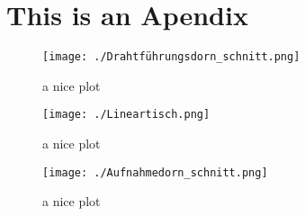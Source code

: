 \appendix

\section{This is an Apendix}
\label{appx:test}

\begin{figure}[H]
    \centering
    \texttt{[image: ./Drahtführungsdorn\_schnitt.png]}
    \caption{a nice plot}
    \label{fig:drahtfuehrungsdorn_schnitt}
\end{figure}

\begin{figure}[H]
    \centering
    \texttt{[image: ./Lineartisch.png]}
    \caption{a nice plot}
    \label{fig:linearstisch}
\end{figure}

\begin{figure}[H]
    \centering
    \texttt{[image: ./Aufnahmedorn\_schnitt.png]}
    \caption{a nice plot}
    \label{fig:aufnahmedorn_schitt}
\end{figure}
